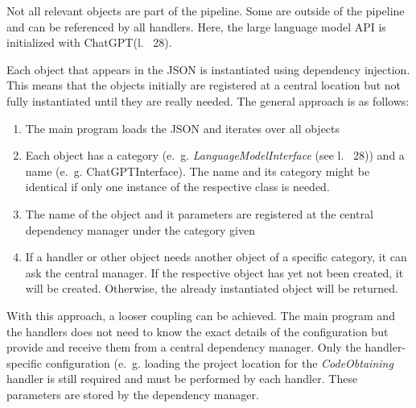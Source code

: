 Not all relevant objects are part of the pipeline. Some are outside of the pipeline and can be referenced by all handlers. Here, the large language model \ac{API} is initialized with ChatGPT(l.~ 28).

Each object that appears in the \ac{JSON} is instantiated using dependency injection. This means that the objects initially are registered at a central location but not fully instantiated until they are really needed. The general approach is as follows:
\begin{enumerate}
    \item The main program loads the \ac{JSON} and iterates over all objects
    \item Each object has a category (e.~g. \textit{LanguageModelInterface} (see l.~ 28)) and a name (e.~g. ChatGPTInterface). The name and its category might be identical if only one instance of the respective class is needed. 
    \item The name of the object and it parameters are registered at the central dependency manager under the category given
    \item If a handler or other object needs another object of a specific category, it can ask the central manager. If the respective object has  yet not been created, it will be created. Otherwise, the already instantiated object will be returned. 
\end{enumerate}
With this approach, a looser coupling can be achieved. The main program and the handlers does not need to know the exact details of the configuration but provide and receive them from a central dependency manager. Only the handler-specific configuration (e.~g. loading the project location  for the \textit{CodeObtaining} handler is still required and must be performed by each handler. These parameters are stored by the dependency manager. 